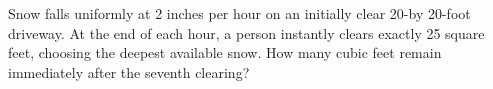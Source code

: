Snow falls uniformly at 2 inches per hour on an initially clear 20-by 20-foot driveway. At the end of each hour, a person instantly clears exactly 25 square feet, choosing the deepest available snow. How many cubic feet remain immediately after the seventh clearing?
